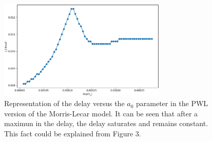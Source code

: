 \documentclass[a4paper,preprint,11pt]{article}
\begin{document}
% 
% 

\begin{figure}[ht]
  \begin{center}
  \includegraphics[width=8cm]{Sp_PWL_dibu4.eps}
  \end{center}
  \caption{Representation of the delay versus the $a_0$ parameter in the PWL version of the Morris-Lecar model. It can be seen that after a maximun in the delay, the delay saturates and remains constant. This fact could be explained from Figure 3.   
}
\end{figure}
\end{document}
